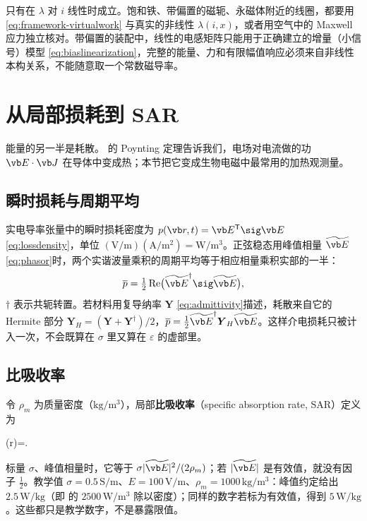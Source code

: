 \begin{pitfall}
只有在 $\lambda$ 对 $i$ 线性时成立。饱和铁、带偏置的磁轭、永磁体附近的线圈，都要用 \eqref{eq:framework-virtualwork} 与真实的非线性 $\lambda(i,x)$，或者用空气中的 Maxwell 应力独立核对。带偏置的装配中，线性的电感矩阵只能用于正确建立的增量（小信号）模型 \eqref{eq:biaslinearization}，完整的能量、力和有限幅值响应必须来自非线性本构关系，不能随意取一个常数磁导率。
\end{pitfall}

\section{从局部损耗到 SAR}\label{sec:framework-sar}

能量的另一半是耗散。 的 Poynting 定理告诉我们，电场对电流做的功 $\vb E\cdot\vb J$ 在导体中变成热；本节把它变成生物电磁中最常用的加热观测量。

\subsection{瞬时损耗与周期平均}
实电导率张量中的瞬时损耗密度为 $p(\vb r,t)=\vb E^{\mathsf T}\sig\vb E$ \eqref{eq:lossdensity}，单位 $(\mathrm{V/m})(\mathrm{A/m^2})=\mathrm{W/m^3}$。正弦稳态用峰值相量 $\widetilde{\vb E}$ \eqref{eq:phasor}时，两个实谐波量乘积的周期平均等于相应相量乘积实部的一半：
\begin{equation}
\overline p=\tfrac12\operatorname{Re}\bigl(\widetilde{\vb E}^{\dagger}\sig\widetilde{\vb E}\bigr),
\label{eq:framework-pavg}
\end{equation}
$\dagger$ 表示共轭转置。若材料用复导纳率 $\boldsymbol Y$ \eqref{eq:admittivity}描述，耗散来自它的 Hermite 部分 $\boldsymbol Y_H=(\boldsymbol Y+\boldsymbol Y^\dagger)/2$，$\overline p=\tfrac12\widetilde{\vb E}^\dagger\boldsymbol Y_H\widetilde{\vb E}$。这样介电损耗只被计入一次，不会既算在 $\sigma$ 里又算在 $\varepsilon$ 的虚部里。

\subsection{比吸收率}
令 $\rho_m$ 为质量密度（$\mathrm{kg/m^3}$），局部\textbf{比吸收率}（specific absorption rate, SAR）定义为
\begin{keyeq}
(\vb r)=\qquad[\mathrm{W/kg}].
\label{eq:localsar}
\end{keyeq}
标量 $\sigma$、峰值相量时，它等于 $\sigma|\widetilde{\vb E}|^2/(2\rho_m)$；若 $|\widetilde{\vb E}|$ 是有效值，就没有因子 $\tfrac12$。教学值 $\sigma=0.5\,\mathrm{S/m}$、$E=100\,\mathrm{V/m}$、$\rho_m=1000\,\mathrm{kg/m^3}$：峰值约定给出 $2.5\,\mathrm{W/kg}$（即 的 $2500\,\mathrm{W/m^3}$ 除以密度）；同样的数字若标为有效值，得到 $5\,\mathrm{W/kg}$。这些都只是教学数字，不是暴露限值。

